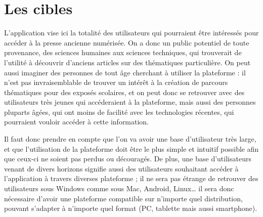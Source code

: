 \section{Les cibles}
\label{sec:cibles}
    L’application vise ici la totalité des utilisateurs qui pourraient être intéressés pour accéder à la presse ancienne numérisée.
    On a donc un public potentiel de toute provenance, des sciences humaines aux sciences techniques, qui trouverait de l’utilité à
    découvrir d’anciens articles sur des thématiques particulière. On peut aussi imaginer des personnes de tout âge cherchant à
    utiliser la plateforme : il n’est pas invraisemblable de trouver un intérêt à la création de parcours thématiques pour des exposés
    scolaires, et on peut donc se retrouver avec des utilisateurs très jeunes qui accéderaient à la plateforme, mais aussi des personnes
    pluparts âgées, qui ont moins de facilité avec les technologies récentes, qui pourraient vouloir accéder à cette information.

    Il faut donc prendre en compte que l’on va avoir une base d’utilisateur très large, et que l’utilisation de la plateforme doit être
    le plus simple et intuitif possible afin que ceux-ci ne soient pas perdus ou découragés. De plus, une base d’utilisateurs venant
    de divers horizons signifie aussi des utilisateurs souhaitant accéder à l’application à travers diverses plateforme ; il ne sera pas
    étrange de retrouver des utilisateurs sous Windows comme sous Mac, Android, Linux… il sera donc nécessaire d’avoir une plateforme
    compatible sur n’importe quel distribution, pouvant s’adapter à n’importe quel format (PC, tablette mais aussi smartphone).
